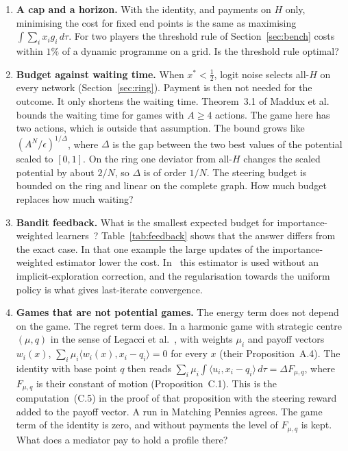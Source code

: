 \documentclass[11pt,a4paper]{article}
\theoremstyle{definition}
\theoremstyle{plain}
\newcommand{\xs}{x^{*}}
\begin{document}
\begin{enumerate}
\item \textbf{A cap and a horizon.} With the identity, and payments on $H$ only, minimising the cost for fixed end points is the same as maximising $\int\sum_ix_ig_i\,d\tau$. For two players the threshold rule of Section~\ref{sec:bench} costs within $1\%$ of a dynamic programme on a grid. Is the threshold rule optimal?
\item \textbf{Budget against waiting time.} When $\xs<\tfrac12$, logit noise selects all-$H$ on every network (Section~\ref{sec:ring}). Payment is then not needed for the outcome. It only shortens the waiting time. Theorem~3.1 of Maddux et al.~\cite{maddux2024} bounds the waiting time for games with $A\ge4$ actions. The game here has two actions, which is outside that assumption. The bound grows like $(A^N/\epsilon)^{1/\Delta}$, where $\Delta$ is the gap between the two best values of the potential scaled to $[0,1]$. On the ring one deviator from all-$H$ changes the scaled potential by about $2/N$, so $\Delta$ is of order $1/N$. The steering budget is bounded on the ring and linear on the complete graph. How much budget replaces how much waiting?
\item \textbf{Bandit feedback.} What is the smallest expected budget for importance-weighted learners~\cite{mertikopoulos2023,fiegel2025}? Table~\ref{tab:feedback} shows that the answer differs from the exact case. In that one example the large updates of the importance-weighted estimator lower the cost. In~\cite{fiegel2025} this estimator is used without an implicit-exploration correction, and the regularisation towards the uniform policy is what gives last-iterate convergence.
\item \textbf{Games that are not potential games.} The energy term does not depend on the game. The regret term does. In a harmonic game with strategic centre $(\mu,q)$ in the sense of Legacci et al.~\cite{legacci2024b}, with weights $\mu_i$ and payoff vectors $w_i(x)$, $\sum_i\mu_i\langle w_i(x),x_i-q_i\rangle=0$ for every $x$ (their Proposition~A.4). The identity with base point $q$ then reads $\sum_i\mu_i\int\langle u_i,x_i-q_i\rangle\,d\tau=\Delta F_{\mu,q}$, where $F_{\mu,q}$ is their constant of motion (Proposition~C.1). This is the computation~(C.5) in the proof of that proposition with the steering reward added to the payoff vector. A run in Matching Pennies agrees. The game term of the identity is zero, and without payments the level of $F_{\mu,q}$ is kept. What does a mediator pay to hold a profile there?

\end{enumerate}
\end{document}
